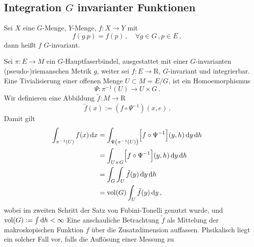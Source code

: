 \subsection[Integration inv Fkt]{Integration $G$ invarianter Funktionen}
\begin{definition}
Sei $X$ eine $G$-Menge, $Y$-Menge, $f:X\to Y$ mit
\begin{equation}
f(g.p)=f(p)\,,\quad \forall g\in G\,,p\in E\,,
\end{equation}
dann heißt $f$ $G$-invariant.
\end{definition}
Sei $\pi: E\to M$ ein $G$-Hauptfaserbündel, ausgestattet mit einer
$G$-invarianten (pseudo-)riemanschen Metrik $g$, weiter sei
$f:E\to \mathrm{R}$, $G$-invariant und integrierbar. Eine Tivialisierung einer
offenen Menge $U\subset M=E/G$, ist ein Homoemorphismus
\begin{equation}
\Psi:\pi^{-1}(U)\to U\times G\,.
\end{equation}
Wir definieren eine Abbildung $\tilde{f}: M\to\mathrm{R}$ 
\begin{equation}
\tilde{f}\left(x\right):=\left(f\circ \Psi^{-1}\right)(x,e)\,.
\end{equation}
Damit gilt 
\begin{equation}
\begin{split}
\int_{\pi^{-1}(U)}f(x)\dif x&=
\int_{\Psi\left(\pi^{-1}(U)\right)}\left[f\circ\Psi^{-1}\right](y,h)\dif y
\dif h\\
&=
\int_{U\times G}\left[f\circ\Psi^{-1}\right](y,h)\dif y
\dif h\\
&=\int_G\int_{U}\tilde{f}\left(y\right)\dif y
\dif h\\ 
&=\vol (G)\int_{U}\tilde{f}\left(y\right)\dif y\,,\label{eq:Intprod}
\end{split}
\end{equation}
wobei im zweiten Schritt der Satz von Fubini-Tonelli genutzt wurde, und
$\vol(G):=\int\dif h<\infty$ Eine anschauliche Betrachtung $\tilde{f}$ als
Mittelung der makroskopischen Funktion $f$ über die Zusatzdimension auffassen.
Phsikalisch liegt ein solcher Fall vor, falls die Auflösung einer Messung zu
